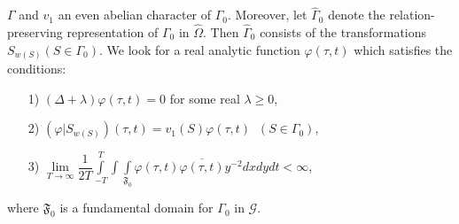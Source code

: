 $\Gamma$ and $v_1$ an even abelian character of $\Gamma_0$. Moreover,
let $\hat{\Gamma}_0$ denote the relation-preserving representation of
$\Gamma_0$ in $\hat{\Omega}$. Then $\hat{\Gamma}_0$ consists of the
transformations $S_{w(S)} (S\in \Gamma_0)$. We look for a real
analytic function $\varphi(\tau, t)$ which satisfies the conditions:
\begin{itemize}
\item[1)] $(\Delta+\lambda)\varphi(\tau, t)=0$ for some real $\lambda
  \geq 0$,

\item[2)] $(\varphi|S_{w(S)}) (\tau,t) = v_1(S)
  \varphi(\tau,t) \;\; (S\in \Gamma_0)$,

\item[3)] $\lim\limits_{T\to\infty} \dfrac{1}{2T} \int\limits^T_{-T}
  \int\int\limits_{\mathfrak{F}_0} \varphi (\tau, t)
  \overline{\varphi(\tau, t)} y^{-2} dx dy dt < \infty$, 
\end{itemize}
where $\mathfrak{F}_0$ is a fundamental domain for $\Gamma_0$ in
$\mathscr{G}$.

